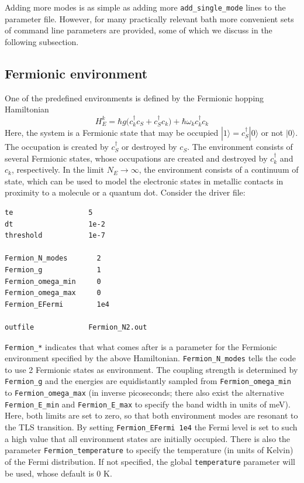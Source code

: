 \documentclass{scrartcl}
\begin{document}
Adding more modes is as simple as adding more \verb+add_single_mode+ lines
to the parameter file. However, for many practically relevant bath more 
convenient sets of command line parameters are provided, some of which 
we discuss in the following subsection.

\subsection{Fermionic environment}
One of the predefined 
environments is defined by the Fermionic hopping Hamiltonian
\begin{equation}
H_E^k=\hbar g \big( c^\dagger_k c_S + c^\dagger_S c_k ) 
+ \hbar\omega_k c^\dagger_k c_k
\end{equation}
Here, the system is a Fermionic state that may be occupied 
$|1\rangle=c_S^\dagger |0\rangle$ or not $|0\rangle$.
The occupation is created by $c^\dagger_S$ or destroyed by $c_S$. 
The environment consists of several Fermionic states, whose 
occupations are created and destroyed by $c^\dagger_k$ and $c_k$, respectively.
In the limit $N_E\to \infty$, the environment consists of a continuum of state,
which can be used to model the electronic states in metallic contacts in
proximity to a molecule or a quantum dot.
Consider the driver file:

\noindent\makebox[5cm]{\rule{7cm}{0.4pt}}
\begin{verbatim}
te                  5
dt                  1e-2
threshold           1e-7

Fermion_N_modes       2
Fermion_g             1 
Fermion_omega_min     0
Fermion_omega_max     0
Fermion_EFermi        1e4

outfile             Fermion_N2.out
\end{verbatim}
\noindent\makebox[5cm]{\rule{7cm}{0.4pt}}

\verb+Fermion_*+ indicates that what comes after is a parameter for
the Fermionic environment specified by the above Hamiltonian. 
\verb+Fermion_N_modes+ tells the code to use 2 Fermionic states as environment.
The coupling strength is determined by \verb+Fermion_g+ and the energies 
are equidistantly sampled from \verb+Fermion_omega_min+ to \verb+Fermion_omega_max+
(in inverse picoseconds; there also exist the alternative 
\verb+Fermion_E_min+ and \verb+Fermion_E_max+ to specify the band width in 
units of meV).
Here, both limits are set to zero, so that both environment modes are 
resonant to the TLS transition. By setting \verb+Fermion_EFermi 1e4+ 
the Fermi level is set to such
a high value that all environment states are initially occupied. 
There is also the parameter \verb+Fermion_temperature+ to specify the temperature
(in units of Kelvin) of the Fermi distribution. 
If not specified, the global \verb+temperature+ 
parameter will be used, whose default is 0 K.
\end{document}

